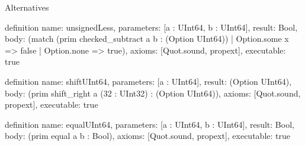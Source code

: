 \begin{lexlean}{Alternatives}
\begin{semanticmodule}
definition{
  name: unsignedLess,
  parameters: [a : UInt64, b : UInt64],
  result: Bool,
  body: (match (prim checked_subtract a b : (Option UInt64))
    | Option.some x => false
    | Option.none => true),
  axioms: [Quot.sound, propext],
  executable: true
}

definition{
  name: shiftUInt64,
  parameters: [a : UInt64],
  result: (Option UInt64),
  body: (prim shift_right a (32 : UInt32) : (Option UInt64)),
  axioms: [Quot.sound, propext],
  executable: true
}

definition{
  name: equalUInt64,
  parameters: [a : UInt64, b : UInt64],
  result: Bool,
  body: (prim equal a b : Bool),
  axioms: [Quot.sound, propext],
  executable: true
}
\end{semanticmodule}
\end{lexlean}
